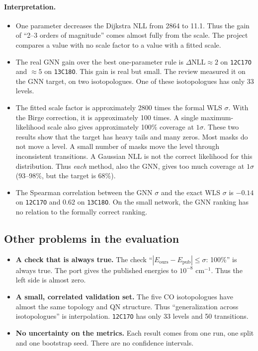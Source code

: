 \documentclass[11pt,a4paper]{article}
\newcommand{\code}[1]{\texttt{#1}}
\newcommand{\cm}{\ensuremath{\mathrm{cm}^{-1}}}
\begin{document}
\paragraph{Interpretation.}
\begin{itemize}
\item One parameter decreases the Dijkstra NLL from 2864 to 11.1. Thus the gain of
  ``2--3 orders of magnitude'' comes almost fully from the scale. The project compares
  a value with no scale factor to a value with a fitted scale.
\item The real GNN gain over the best one-parameter rule is
  $\Delta\mathrm{NLL} \approx 2$ on \code{12C17O} and $\approx 5$ on \code{13C18O}. This
  gain is real but small. The review measured it on the GNN target, on two
  isotopologues. One of these isotopologues has only 33 levels.
\item The fitted scale factor is approximately 2800 times the formal WLS $\sigma$. With
  the Birge correction, it is approximately 100 times. A single maximum-likelihood
  scale also gives approximately 100\% coverage at $1\sigma$. These two results show
  that the target has heavy tails and many zeros. Most masks do not move a level. A
  small number of masks move the level through inconsistent transitions. A Gaussian
  NLL is not the correct likelihood for this distribution. Thus \emph{each} method,
  also the GNN, gives too much coverage at $1\sigma$ (93--98\%, but the target is 68\%).
\item The Spearman correlation between the GNN $\sigma$ and the exact WLS $\sigma$ is
  $-0.14$ on \code{12C17O} and $0.62$ on \code{13C18O}. On the small network, the GNN
  ranking has no relation to the formally correct ranking.
\end{itemize}

\subsection{Other problems in the evaluation}
\begin{itemize}
\item \textbf{A check that is always true.} The check
  ``$|E_{\mathrm{ours}} - E_{\mathrm{pub}}| \le \sigma$: 100\%'' is always true. The
  port gives the published energies to $10^{-8}$ \cm. Thus the left side is almost
  zero.
\item \textbf{A small, correlated validation set.} The five CO isotopologues have
  almost the same topology and QN structure. Thus ``generalization across
  isotopologues'' is interpolation. \code{12C17O} has only 33 levels and 50
  transitions.
\item \textbf{No uncertainty on the metrics.} Each result comes from one run, one split
  and one bootstrap seed. There are no confidence intervals.
\end{itemize}
\end{document}
